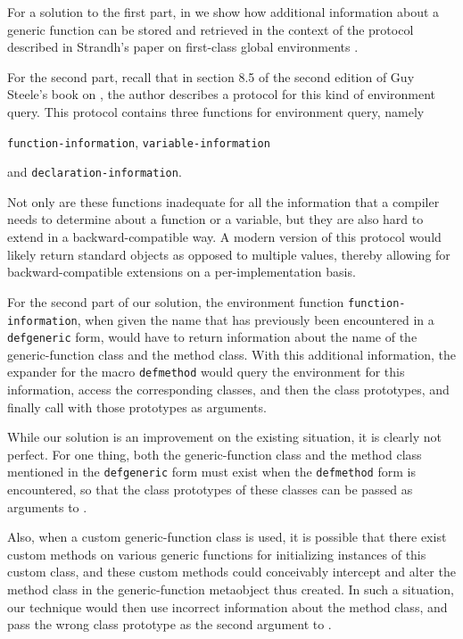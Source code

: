 For a solution to the first part, in  we show how
additional information about a generic function can be stored and
retrieved in the context of the protocol described in Strandh's paper
on first-class global environments
\cite{Strandh:2015:ELS:Environments}.

For the second part, recall that in section 8.5 of the second edition
of Guy Steele's book on \commonlisp{} \cite{Steele:1990:CLL:95411},
the author describes a protocol for this kind of environment query.
This protocol contains three functions for environment query, namely

\texttt{function-information}, \texttt{variable-information}

and
\texttt{declaration-information}.

Not only are these functions inadequate for all the information that a
compiler needs to determine about a function or a variable, but they
are also hard to extend in a backward-compatible way.  A modern
version of this protocol would likely return standard objects as
opposed to multiple values, thereby allowing for backward-compatible
extensions on a per-implementation basis.

For the second part of our solution, the environment function
\texttt{function-information}, when given the name that has previously
been encountered in a \texttt{defgeneric} form, would have to return
information about the name of the generic-function class and the
method class.  With this additional information, the expander for the
macro \texttt{defmethod} would query the environment for this
information, access the corresponding classes, and then the class
prototypes, and finally call \mml{} with those prototypes as
arguments.

While our solution is an improvement on the existing situation, it is
clearly not perfect.  For one thing, both the generic-function class
and the method class mentioned in the \texttt{defgeneric} form must
exist when the \texttt{defmethod} form is encountered, so that the
class prototypes of these classes can be passed as arguments to \mml{}.

Also, when a custom generic-function class is used, it is possible
that there exist custom methods on various generic functions for
initializing instances of this custom class, and these custom methods
could conceivably intercept and alter the method class in the
generic-function metaobject thus created.  In such a situation, our
technique would then use incorrect information about the method class,
and pass the wrong class prototype as the second argument to \mml{}.
